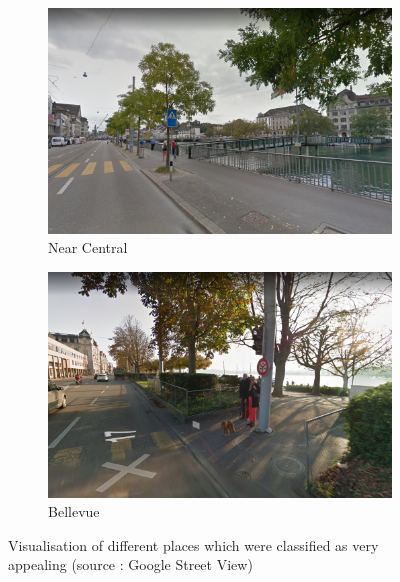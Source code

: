 \documentclass[letterpaper]{article}
\begin{document}
\begin{figure}[H]
\begin{subfigure}[t]{.45\columnwidth}
        \includegraphics[width=\linewidth]{images/good/central.png}
        \caption[width=.9\linewidth]{Near Central}
    \end{subfigure}\hspace{0.05\columnwidth}
    \begin{subfigure}[t]{.45\columnwidth}
        \centering
        \includegraphics[width=\linewidth]{images/good/bellevue.png}
        \caption[width=.9\linewidth]{Bellevue}
    \end{subfigure}\vspace{1mm}
    \caption{Visualisation of different places which were classified as very appealing (source : Google Street View)}
    \label{fig:NicePlaces}
\end{figure}
\end{document}
